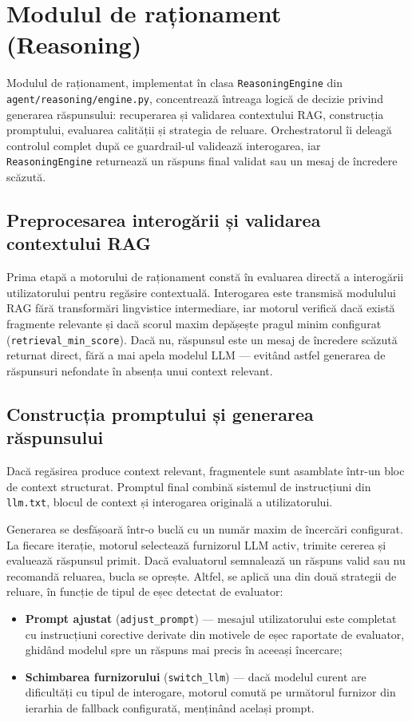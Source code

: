 \documentclass[12pt, a4paper, oneside, romanian]{teza-upb}
\begin{document}
\section{Modulul de raționament (Reasoning)}
\label{sec:reasoning}

Modulul de raționament, implementat în clasa \texttt{ReasoningEngine} din \texttt{agent/reasoning/engine.py}, concentrează întreaga logică de decizie privind generarea răspunsului: recuperarea și validarea contextului RAG, construcția promptului, evaluarea calității și strategia de reluare. Orchestratorul îi deleagă controlul complet după ce guardrail-ul validează interogarea, iar \texttt{ReasoningEngine} returnează un răspuns final validat sau un mesaj de încredere scăzută.

\subsection{Preprocesarea interogării și validarea contextului RAG}

Prima etapă a motorului de raționament constă în evaluarea directă a interogării utilizatorului pentru regăsire contextuală. Interogarea este transmisă modulului RAG fără transformări lingvistice intermediare, iar motorul verifică dacă există fragmente relevante și dacă scorul maxim depășește pragul minim configurat (\texttt{retrieval\_min\_score}). Dacă nu, răspunsul este un mesaj de încredere scăzută returnat direct, fără a mai apela modelul LLM — evitând astfel generarea de răspunsuri nefondate în absența unui context relevant.

\subsection{Construcția promptului și generarea răspunsului}

Dacă regăsirea produce context relevant, fragmentele sunt asamblate într-un bloc de context structurat. Promptul final combină sistemul de instrucțiuni din \texttt{llm.txt}, blocul de context și interogarea originală a utilizatorului.

Generarea se desfășoară într-o buclă cu un număr maxim de încercări configurat. La fiecare iterație, motorul selectează furnizorul LLM activ, trimite cererea și evaluează răspunsul primit. Dacă evaluatorul semnalează un răspuns valid sau nu recomandă reluarea, bucla se oprește. Altfel, se aplică una din două strategii de reluare, în funcție de tipul de eșec detectat de evaluator:

\begin{itemize}
    \item \textbf{Prompt ajustat} (\texttt{adjust\_prompt}) — mesajul utilizatorului este completat cu instrucțiuni corective derivate din motivele de eșec raportate de evaluator, ghidând modelul spre un răspuns mai precis în aceeași încercare;
    \item \textbf{Schimbarea furnizorului} (\texttt{switch\_llm}) — dacă modelul curent are dificultăți cu tipul de interogare, motorul comută pe următorul furnizor din ierarhia de fallback configurată, menținând același prompt.
\end{itemize}
\end{document}
